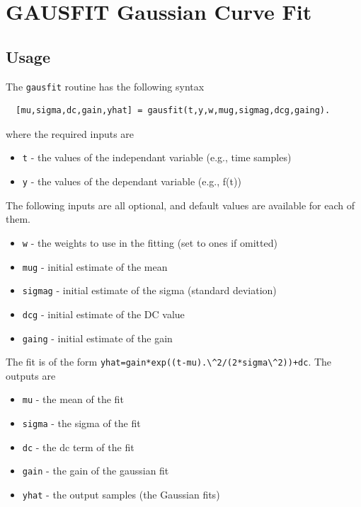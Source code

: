 \section{GAUSFIT Gaussian Curve Fit}

\subsection{Usage}

The \verb|gausfit| routine has the following syntax
\begin{verbatim}
  [mu,sigma,dc,gain,yhat] = gausfit(t,y,w,mug,sigmag,dcg,gaing).
\end{verbatim}
where the required inputs are
\begin{itemize}
\item  \verb|t| - the values of the independant variable (e.g., time samples)

\item  \verb|y| - the values of the dependant variable (e.g., f(t))

\end{itemize}
The following inputs are all optional, and default values are
available for each of them.
\begin{itemize}
\item  \verb|w| - the weights to use in the fitting (set to ones if omitted)

\item  \verb|mug| - initial estimate of the mean

\item  \verb|sigmag| - initial estimate of the sigma (standard deviation)

\item  \verb|dcg| - initial estimate of the DC value

\item  \verb|gaing| - initial estimate of the gain

\end{itemize}
The fit is of the form \verb|yhat=gain*exp((t-mu).\^2/(2*sigma\^2))+dc|.
The outputs are 
\begin{itemize}
\item  \verb|mu| - the mean of the fit

\item  \verb|sigma| - the sigma of the fit

\item  \verb|dc| - the dc term of the fit

\item  \verb|gain| - the gain of the gaussian fit

\item  \verb|yhat| - the output samples (the Gaussian fits)

\end{itemize}
